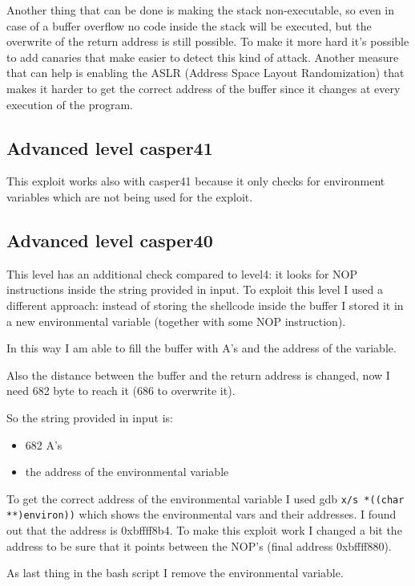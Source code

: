 \documentclass[a4paper,12pt]{article}
\begin{document}
Another thing that can be done is making the stack non-executable, so even in case of a buffer overflow no code inside the stack will be executed, but the overwrite of the return address is still possible. To make it more hard it's possible to add canaries that make easier to detect this kind of attack. Another measure that can help is enabling the ASLR (Address Space Layout Randomization) that makes it harder to get the correct address of the buffer since it changes at every execution of the program.

\subsection{Advanced level casper41}

This exploit works also with casper41 because it only checks for environment variables which are not being used for the exploit. 

\subsection{Advanced level casper40}

This level has an additional check compared to level4: it looks for NOP instructions inside the string provided in input. To exploit this level I used a different approach: instead of storing the shellcode inside the buffer I stored it in a new environmental variable (together with some NOP instruction).  

In this way I am able to fill the buffer with A's and the address of the variable.

Also the distance between the buffer and the return address is changed, now I need 682 byte to reach it (686 to overwrite it).

So the string provided in input is:
\begin{itemize}
\item 682 A's
\item the address of the environmental variable
\end{itemize}

To get the correct address of the environmental variable I used gdb \texttt{x/s *((char **)environ))} which shows the environmental vars and their addresses. I found out that the address is 0xbffff8b4. To make this exploit work I changed a bit the address to be sure that it points between the NOP's (final address 0xbffff880).

As last thing in the bash script I remove the environmental variable.
\end{document}
